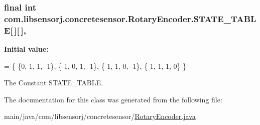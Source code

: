 \subsubsection[{S\+T\+A\+T\+E\+\_\+\+T\+A\+B\+L\+E}]{\setlength{\rightskip}{0pt plus 5cm}final int com.\+libsensorj.\+concretesensor.\+Rotary\+Encoder.\+S\+T\+A\+T\+E\+\_\+\+T\+A\+B\+L\+E\mbox{[}$\,$\mbox{]}\mbox{[}$\,$\mbox{]}\hspace{0.3cm}{\ttfamily [static]}, {\ttfamily [private]}}\label{classcom_1_1libsensorj_1_1concretesensor_1_1RotaryEncoder_aca1c89ca07e97ca484ae85517660b9f0}
{\bfseries Initial value\+:}
\begin{DoxyCode}
= \{
        \{0, 1, 1, -1\},
        \{-1, 0, 1, -1\},
        \{-1, 1, 0, -1\},
        \{-1, 1, 1, 0\}
    \}
\end{DoxyCode}
The Constant S\+T\+A\+T\+E\+\_\+\+T\+A\+B\+L\+E. 

The documentation for this class was generated from the following file\+:\begin{DoxyCompactItemize}
\item 
main/java/com/libsensorj/concretesensor/\hyperlink{RotaryEncoder_8java}{Rotary\+Encoder.\+java}\end{DoxyCompactItemize}
